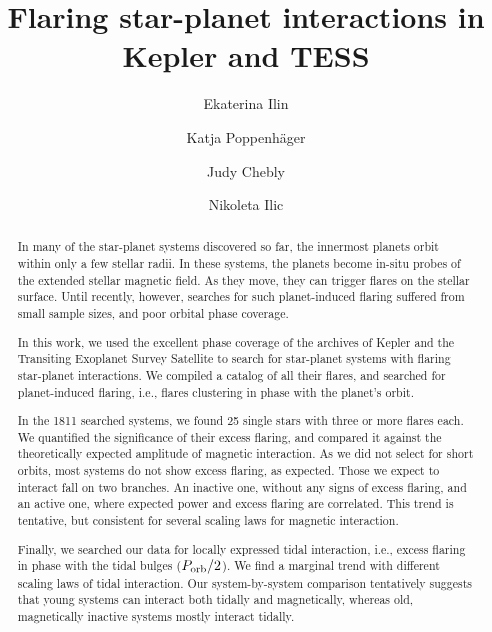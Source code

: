 \documentclass[twocolumn]{aastex631}
\begin{document}
\title{Flaring star-planet interactions in Kepler and TESS}

\author{Ekaterina Ilin}
\author{Katja Poppenh\"ager}
\author{Judy Chebly}
\author{Nikoleta Ilic}

\begin{abstract}
    In many of the star-planet systems discovered so far, the innermost planets orbit within only a few stellar radii. In these systems, the planets become in-situ probes of the extended stellar magnetic field. As they move, they can trigger flares on the stellar surface. Until recently, however, searches for such planet-induced flaring suffered from small sample sizes, and poor orbital phase coverage.

    In this work, we used the excellent phase coverage of the archives of Kepler and the Transiting Exoplanet Survey Satellite to search for star-planet systems with flaring star-planet interactions. We compiled a catalog of all their flares, and searched for planet-induced flaring, i.e., flares clustering in phase with the planet's orbit. 

    In the 1811 searched systems, we found 25 single stars with three or more flares each. We quantified the significance of their excess flaring, and compared it against the theoretically expected amplitude of magnetic interaction. As we did not select for short orbits, most systems do not show excess flaring, as expected. Those we expect to interact fall on two branches. An inactive one, without any signs of excess flaring, and an active one, where expected power and excess flaring are correlated. This trend is tentative, but consistent for several scaling laws for magnetic interaction. 
    
    Finally, we searched our data for locally expressed tidal interaction, i.e., excess flaring in phase with the tidal bulges ($P_{\rm orb}/2$). We find a marginal trend with different scaling laws of tidal interaction. Our system-by-system comparison tentatively suggests that young systems can interact both tidally and magnetically, whereas old, magnetically inactive systems mostly interact tidally.
\end{abstract}

\end{document}
